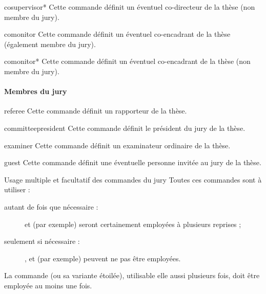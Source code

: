\begin{docCommand}{cosupervisor*}{}
  Cette commande définit un éventuel co-directeur de la thèse (non membre du jury).
\end{docCommand}

\begin{docCommand}{comonitor}{}
  Cette commande définit un éventuel co-encadrant de la thèse (également membre du jury).
\end{docCommand}

\begin{docCommand}{comonitor*}{}
  Cette commande définit un éventuel co-encadrant de la thèse (non membre du jury).
\end{docCommand}

\paragraph{Membres du jury}\label{sec-definition-jury}

\begin{docCommand}{referee}{}
  Cette commande définit un rapporteur de la thèse.
\end{docCommand}

\begin{docCommand}{committeepresident}{}
  Cette commande définit le président du jury de la thèse.
\end{docCommand}

\begin{docCommand}{examiner}{}
  Cette commande définit un examinateur ordinaire de la thèse.
\end{docCommand}

\begin{docCommand}{guest}{}
  Cette commande définit une éventuelle personne invitée au jury de la thèse.
\end{docCommand}
%
\begin{dbwarning}{Usage multiple et facultatif des commandes du
    jury}{}
  Toutes ces commandes sont à utiliser :
  \begin{description}
  \item[autant de fois que nécessaire :]
     et  (par exemple) seront
    certainement employées à plusieurs reprises ;
  \item[seulement si nécessaire :]
    ,  et  (par
    exemple) peuvent ne pas être employées.
  \end{description}
  La commande  (ou sa variante étoilée), utilisable elle
  aussi plusieurs fois, doit être employée au moins une fois.
\end{dbwarning}

